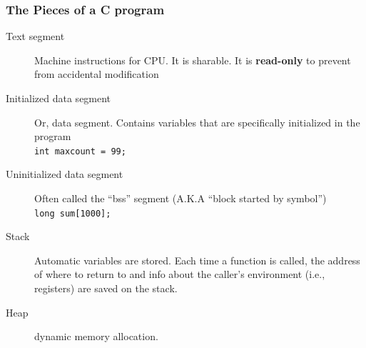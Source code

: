 \documentclass[newPxFont,sthlmFooter,nooffset]{beamer}
\begin{document}
\begin{frame}[t]
  \frametitle{The Pieces of a C program}
  \begin{description}
  \item[Text segment] Machine instructions for CPU. It is sharable. It is \textbf{read-only} to prevent from accidental modification
  \item[Initialized data segment] Or, data segment. Contains variables that are specifically initialized in the program \\
\texttt{int maxcount = 99;}
\item[Uninitialized data segment] Often called the ``bss'' segment (A.K.A ``block started by symbol'') \\
\texttt{long sum[1000];}
\item[Stack] Automatic variables are stored. Each time a function is called, the address of where to return to and info about the caller's environment (i.e., registers) are saved on the stack.
\item[Heap] dynamic memory allocation.
  \end{description}


\end{frame}
\end{document}
